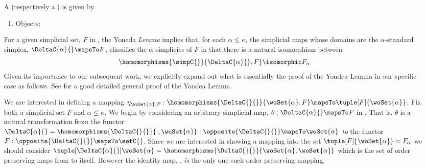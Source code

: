 \begin{definition}
A  (respectively a ) is 
given by
\begin{enumerate}
\item Objects: 
\end{enumerate}
\end{definition}


For a given simplicial set, $F$ in \simpC{}, the Yoneda \emph{Lemma} implies that, for each 
$\alpha \leq \kappa$, the simplicial maps whose domains are the $\alpha$-standard simplex, 
$\DeltaC{\alpha}{} \mapsTo F$, classifies the $\alpha$-simplicies of $F$ in that there is a 
natural isomorphism between $$ \homomorphisms{\simpC{}}{\DeltaC{\alpha}{}, F} \isomorphic 
F_{\alpha} $$ Given its importance to our subsequent work, we explicitly expand out what is 
essentially the proof of the Yondea Lemma in our specific case as follows. See \cite[Lemma 
8.2]{awodey2006catTh} for a good detailed general proof of the Yondea Lemma.

We are interested in defining a mapping $\eta_{\woSet{\alpha},F} : 
\homomorphisms{\DeltaC{}{}}{\woSet{\alpha},F} \mapsTo \tuple[F]{\woSet{\alpha}}$. Fix both a 
simplicial set $F$ and $\alpha \leq \kappa$. We begin by considering an arbitrary simplicial 
map, $\theta : \DeltaC{\alpha}{} \mapsTo F$ in . That is, $\theta$ is a natural transformation from the functor $\DeltaC{\alpha}{} = 
\homomorphisms{\DeltaC{}{}}{\cdot, \woSet{\alpha}} : \opposite{\DeltaC{}{}} \mapsTo 
\woSet{\alpha}$ \emph{to} the functor $F : \opposite{\DeltaC{}{}} \mapsTo \setC{}$. Since we 
are interested in showing a mapping into the set $\tuple[F]{\woSet{\alpha}} = F_{\alpha}$ we 
should consider $\tuple[\DeltaC{\alpha}{}]{\woSet{\alpha}} = 
\homomorphisms{\DeltaC{}{}}{\woSet{\alpha},\woSet{\alpha}}$ which is the set of order 
preserving maps from \woSet{\alpha} to itself.  However the identity map, 
\identity{\woSet{\alpha}}, \emph{is} the only one such order preserving mapping. 

